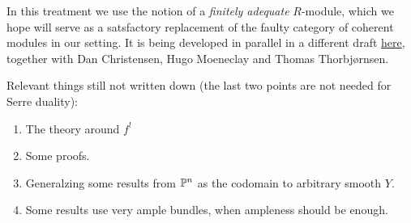 In this treatment we use the notion of a \emph{finitely adequate} $R$-module, which we hope will serve as a satsfactory replacement of the faulty category of coherent modules in our setting.
It is being developed in parallel in a different draft \href{https://felix-cherubini.de/adequate-modules.pdf}{here}, together with Dan Christensen, Hugo Moeneclay and Thomas Thorbjørnsen.
\bigskip

{\color{red}
  Relevant things still not written down (the last two points are not needed for Serre duality):

  \begin{enumerate}
    \item The theory around $f^!$
    \item Some proofs.
    \item Generalzing some results from $\mathbb{P}^n$ as the codomain to arbitrary smooth $Y$.
    \item Some results use very ample bundles, when ampleness should be enough.
  \end{enumerate}
}
